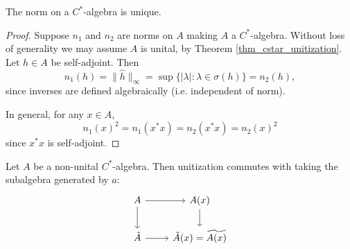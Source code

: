 \documentclass[12pt]{article}
\begin{document}
\begin{theorem}
	The norm on a $C^\ast$-algebra is unique. 
\end{theorem}
\begin{proof}
	Suppose $n_1$ and $n_2$ are norms on $A$ making $A$ a $C^\ast$-algebra. Without loss of generality we may assume $A$ is unital, by Theorem \ref{thm_cstar_unitization}. Let $h\in A$ be self-adjoint. Then 
	\begin{equation*}
		n_1(h) = \|\hat{h}\|_\infty = \sup\{|\lambda| : \lambda\in\sigma(h)\} = n_2(h),
	\end{equation*}
	since inverses are defined algebraically (i.e. independent of norm).

	In general, for any $x\in A$, 
	\begin{equation*}
		n_1(x)^2 = n_1(x^\ast x) = n_2(x^\ast x) = n_2(x)^2
	\end{equation*}
	since $x^\ast x$ is self-adjoint.
\end{proof}

\begin{corollary}
	Let $A$ be a non-unital $C^\ast$-algebra. Then unitization commutes with taking the subalgebra generated by $a$:
	\[
		\begin{tikzcd}
			A \arrow[d] \arrow[r] & A(x) \arrow[d]                \\
			\tilde{A} \arrow[r]   & \tilde{A}(x)=\widetilde{A(x)}
		\end{tikzcd}
	\]
\end{corollary}
\end{document}
